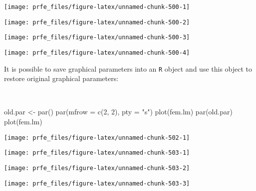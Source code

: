 \documentclass[
  12pt,
  a4paper]{book}
\newenvironment{Shaded}{\begin{snugshade}}{\end{snugshade}}
\newcommand{\AttributeTok}[1]{\textcolor[rgb]{0.77,0.63,0.00}{#1}}
\newcommand{\DecValTok}[1]{\textcolor[rgb]{0.00,0.00,0.81}{#1}}
\newcommand{\FunctionTok}[1]{\textcolor[rgb]{0.00,0.00,0.00}{#1}}
\newcommand{\NormalTok}[1]{#1}
\newcommand{\OtherTok}[1]{\textcolor[rgb]{0.56,0.35,0.01}{#1}}
\newcommand{\StringTok}[1]{\textcolor[rgb]{0.31,0.60,0.02}{#1}}
\begin{document}
\newpage

\begin{center}\texttt{[image: prfe\_files/figure-latex/unnamed-chunk-500-1]} \end{center}

\begin{center}\texttt{[image: prfe\_files/figure-latex/unnamed-chunk-500-2]} \end{center}

\begin{center}\texttt{[image: prfe\_files/figure-latex/unnamed-chunk-500-3]} \end{center}

\begin{center}\texttt{[image: prfe\_files/figure-latex/unnamed-chunk-500-4]} \end{center}

\newpage

It is possible to save graphical parameters into an \texttt{R} object and use this object to restore original graphical parameters:

~

\begin{Shaded}
\begin{Highlighting}[]
\NormalTok{old.par }\OtherTok{\textless{}{-}} \FunctionTok{par}\NormalTok{()}
\FunctionTok{par}\NormalTok{(}\AttributeTok{mfrow =} \FunctionTok{c}\NormalTok{(}\DecValTok{2}\NormalTok{, }\DecValTok{2}\NormalTok{), }\AttributeTok{pty =} \StringTok{"s"}\NormalTok{)}
\FunctionTok{plot}\NormalTok{(fem.lm)}
\FunctionTok{par}\NormalTok{(old.par)}
\FunctionTok{plot}\NormalTok{(fem.lm)}
\end{Highlighting}
\end{Shaded}

\begin{center}\texttt{[image: prfe\_files/figure-latex/unnamed-chunk-502-1]} \end{center}

\newpage

\begin{center}\texttt{[image: prfe\_files/figure-latex/unnamed-chunk-503-1]} \end{center}

\begin{center}\texttt{[image: prfe\_files/figure-latex/unnamed-chunk-503-2]} \end{center}

\begin{center}\texttt{[image: prfe\_files/figure-latex/unnamed-chunk-503-3]} \end{center}
\end{document}
